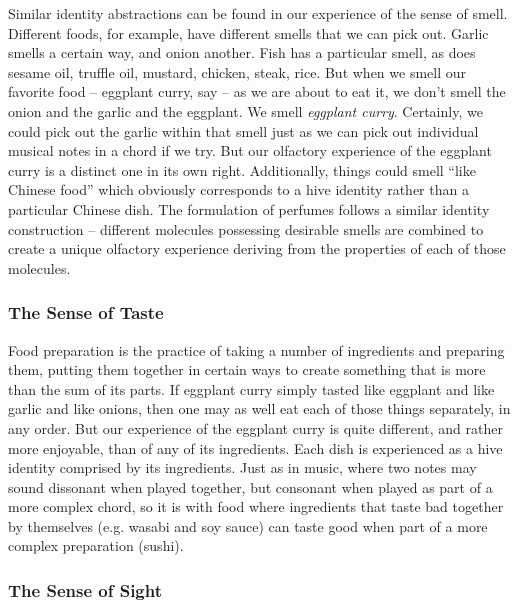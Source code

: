 \documentclass[pra,twocolumn,groupedaddress,10pt]{revtex4}
\theoremstyle{definition}
\begin{document}
Similar identity abstractions can be found in our experience of the sense of smell. Different foods, for example, have different smells that we can pick out. Garlic smells a certain way, and onion another. Fish has a particular smell, as does sesame oil, truffle oil, mustard, chicken, steak, rice. But when we smell our favorite food -- eggplant curry, say -- as we are about to eat it, we don't smell the onion and the garlic and the eggplant. We smell \textit{eggplant curry}. Certainly, we could pick out the garlic within that smell just as we can pick out individual musical notes in a chord if we try. But our olfactory experience of the eggplant curry is a distinct one in its own right. Additionally, things could smell ``like Chinese food'' which obviously corresponds to a hive identity rather than a particular Chinese dish. The formulation of perfumes follows a similar identity construction -- different molecules possessing desirable smells are combined to create a unique olfactory experience deriving from the properties of each of those molecules\cite{smellmolecules}.

\subsubsection{The Sense of Taste} \label{sec:sentas}

Food preparation is the practice of taking a number of ingredients and preparing them, putting them together in certain ways to create something that is more than the sum of its parts. If eggplant curry simply tasted like eggplant and like garlic and like onions, then one may as well eat each of those things separately, in any order. But our experience of the eggplant curry is quite different, and rather more enjoyable, than of any of its ingredients. Each dish is experienced as a hive identity comprised by its ingredients. Just as in music, where two notes may sound dissonant when played together, but consonant when played as part of a more complex chord, so it is with food where ingredients that taste bad together by themselves (e.g. wasabi and soy sauce) can taste good when part of a more complex preparation (sushi).

\subsubsection{The Sense of Sight} \label{sec:sensig}
\end{document}
